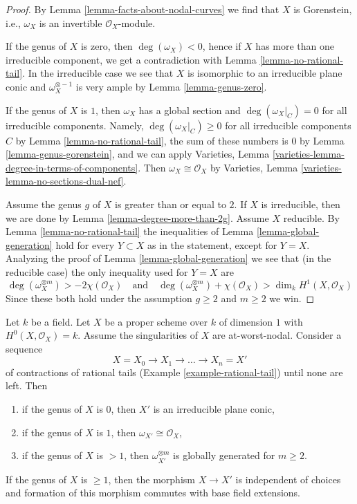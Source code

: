 \begin{proof}
By Lemma \ref{lemma-facts-about-nodal-curves} we find that $X$ is
Gorenstein, i.e., $\omega_X$ is an invertible $\mathcal{O}_X$-module.

\medskip\noindent
If the genus of $X$ is zero, then $\deg(\omega_X) < 0$, hence if
$X$ has more than one irreducible component, we get a contradiction
with Lemma \ref{lemma-no-rational-tail}. In the irreducible case
we see that $X$ is isomorphic to an irreducible plane conic and
$\omega_X^{\otimes -1}$ is very ample by Lemma \ref{lemma-genus-zero}.

\medskip\noindent
If the genus of $X$ is $1$, then $\omega_X$ has a global section and
$\deg(\omega_X|_C) = 0$ for all irreducible components.
Namely, $\deg(\omega_X|_C) \geq 0$ for all irreducible components $C$
by Lemma \ref{lemma-no-rational-tail}, the sum of these numbers is
$0$ by Lemma \ref{lemma-genus-gorenstein}, and we can apply
Varieties, Lemma \ref{varieties-lemma-degree-in-terms-of-components}.
Then $\omega_X \cong \mathcal{O}_X$ by
Varieties, Lemma \ref{varieties-lemma-no-sections-dual-nef}.

\medskip\noindent
Assume the genus $g$ of $X$ is greater than or equal to $2$.
If $X$ is irreducible, then we are done by
Lemma \ref{lemma-degree-more-than-2g}.
Assume $X$ reducible.
By Lemma \ref{lemma-no-rational-tail} the
inequalities of Lemma \ref{lemma-global-generation}
hold for every $Y \subset X$ as in the statement, except for
$Y = X$. Analyzing the proof of Lemma \ref{lemma-global-generation}
we see that (in the reducible case) the only inequality
used for $Y = X$ are
$$
\deg(\omega_X^{\otimes m}) > -2 \chi(\mathcal{O}_X)
\quad\text{and}\quad
\deg(\omega_X^{\otimes m}) + \chi(\mathcal{O}_X) > \dim_k H^1(X, \mathcal{O}_X)
$$
Since these both hold under the assumption $g \geq 2$ and $m \geq 2$ we win.
\end{proof}

\begin{lemma}
\label{lemma-contracting-rational-tails}
Let $k$ be a field. Let $X$ be a proper scheme over $k$ of dimension $1$
with $H^0(X, \mathcal{O}_X) = k$. Assume the singularities of $X$ are
at-worst-nodal. Consider a sequence
$$
X = X_0 \to X_1 \to \ldots \to X_n = X'
$$
of contractions of rational tails (Example \ref{example-rational-tail})
until none are left. Then
\begin{enumerate}
\item if the genus of $X$ is $0$, then $X'$ is an irreducible
plane conic,
\item if the genus of $X$ is $1$, then $\omega_{X'} \cong \mathcal{O}_X$,
\item if the genus of $X$ is $> 1$, then
$\omega_{X'}^{\otimes m}$ is globally generated for $m \geq 2$.
\end{enumerate}
If the genus of $X$ is $\geq 1$, then the morphism $X \to X'$
is independent of choices and formation of this morphism
commutes with base field extensions.
\end{lemma}

